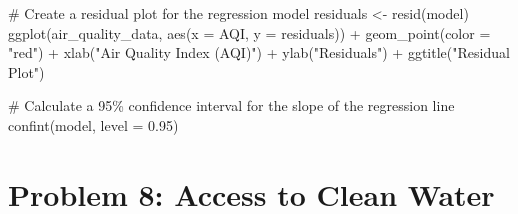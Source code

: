 \documentclass[
  letterpaper,
  DIV=11,
  numbers=noendperiod]{scrreprt}
\newenvironment{Shaded}{\begin{snugshade}}{\end{snugshade}}
\newcommand{\AttributeTok}[1]{\textcolor[rgb]{0.40,0.45,0.13}{#1}}
\newcommand{\CommentTok}[1]{\textcolor[rgb]{0.37,0.37,0.37}{#1}}
\newcommand{\FloatTok}[1]{\textcolor[rgb]{0.68,0.00,0.00}{#1}}
\newcommand{\FunctionTok}[1]{\textcolor[rgb]{0.28,0.35,0.67}{#1}}
\newcommand{\NormalTok}[1]{\textcolor[rgb]{0.00,0.23,0.31}{#1}}
\newcommand{\OtherTok}[1]{\textcolor[rgb]{0.00,0.23,0.31}{#1}}
\newcommand{\SpecialCharTok}[1]{\textcolor[rgb]{0.37,0.37,0.37}{#1}}
\newcommand{\StringTok}[1]{\textcolor[rgb]{0.13,0.47,0.30}{#1}}
\begin{document}
\begin{Shaded}
\begin{Highlighting}[]
\CommentTok{\# Create a residual plot for the regression model}
\NormalTok{residuals }\OtherTok{\textless{}{-}} \FunctionTok{resid}\NormalTok{(model)}
\FunctionTok{ggplot}\NormalTok{(air\_quality\_data, }\FunctionTok{aes}\NormalTok{(}\AttributeTok{x =}\NormalTok{ AQI, }\AttributeTok{y =}\NormalTok{ residuals)) }\SpecialCharTok{+}
  \FunctionTok{geom\_point}\NormalTok{(}\AttributeTok{color =} \StringTok{"red"}\NormalTok{) }\SpecialCharTok{+}
  \FunctionTok{xlab}\NormalTok{(}\StringTok{"Air Quality Index (AQI)"}\NormalTok{) }\SpecialCharTok{+} \FunctionTok{ylab}\NormalTok{(}\StringTok{"Residuals"}\NormalTok{) }\SpecialCharTok{+} 
  \FunctionTok{ggtitle}\NormalTok{(}\StringTok{"Residual Plot"}\NormalTok{)}

\CommentTok{\# Calculate a 95\% confidence interval for the slope of the regression line}
\FunctionTok{confint}\NormalTok{(model, }\AttributeTok{level =} \FloatTok{0.95}\NormalTok{)}
\end{Highlighting}
\end{Shaded}

\section*{Problem 8: Access to Clean
Water}\label{problem-8-access-to-clean-water-1}

\end{document}

